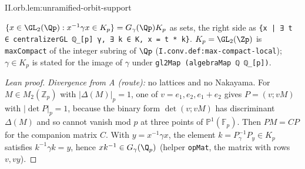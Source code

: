 \begin{lemma}
\end{lemma}
\begin{tfformal}{II.orb.lem:unramified-orbit-support}
\begin{tffidelity}
$\{x\in\GL_2(\Qp):x^{-1}\gamma x\in K_p\}=G_\gamma(\Qp)K_p$ as sets, the right side as \texttt{\{x | ∃ t ∈ centralizerGL ℚ\_[p] γ, ∃ k ∈ K, x = t * k\}}. $K_p=\GL_2(\Zp)$ is \texttt{maxCompact} of the integer subring of $\Qp$ (\texttt{I.conv.def:max-compact-local}); $\gamma\in K_p$ is stated for the image of $\gamma$ under \texttt{gl2Map (algebraMap ℚ ℚ\_[p])}.
\end{tffidelity}
\end{tfformal}
\begin{proof}[Lean proof]
\emph{Divergence from A (route):} no lattices and no Nakayama. For $M\in M_2(\mathbb Z_p)$ with $|\Delta(M)|_p=1$, one of $v=e_1,e_2,e_1+e_2$ gives $P=(v;vM)$ with $|\det P|_p=1$, because the binary form $\det(v;vM)$ has discriminant $\Delta(M)$ and so cannot vanish mod $p$ at three points of $\mathbb P^1(\mathbb F_p)$. Then $PM=CP$ for the companion matrix $C$. With $y=x^{-1}\gamma x$, the element $k=P_\gamma^{-1}P_y\in K_p$ satisfies $k^{-1}\gamma k=y$, hence $xk^{-1}\in G_\gamma(\Q_p)$ (helper \texttt{opMat}, the matrix with rows $v,vy$).
\end{proof}


